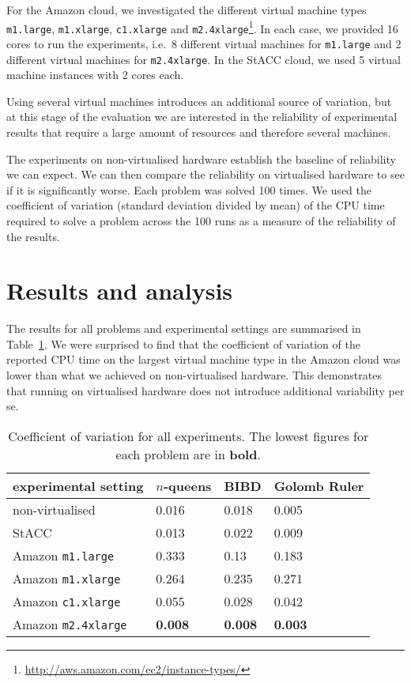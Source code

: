 \documentclass{llncs}
\begin{document}
For the Amazon cloud, we investigated the different virtual machine types
\texttt{m1.large}, \texttt{m1.xlarge}, \texttt{c1.xlarge} and
\texttt{m2.4xlarge}\footnote{\url{http://aws.amazon.com/ec2/instance-types/}}.
In each case, we provided 16 cores to run the experiments, i.e.\ 8 different
virtual machines for \texttt{m1.large} and 2 different virtual machines for
\texttt{m2.4xlarge}. In the StACC cloud, we used 5 virtual machine instances
with 2 cores each.

Using several virtual machines introduces an additional source of variation, but
at this stage of the evaluation we are interested in the reliability of
experimental results that require a large amount of resources and therefore
several machines.

The experiments on non-virtualised hardware establish the baseline of
reliability we can expect. We can then compare the reliability on virtualised
hardware to see if it is significantly worse. Each problem was solved 100 times.
We used the coefficient of variation (standard deviation divided by mean) of the
CPU time required to solve a problem across the 100 runs as a measure of the
reliability of the results.


\section{Results and analysis}

The results for all problems and experimental settings are summarised in
Table~\ref{res}. We were surprised to find that the coefficient of variation of
the reported CPU time on the largest virtual machine type in the Amazon cloud
was lower than what we achieved on non-virtualised hardware. This demonstrates
that running on virtualised hardware does not introduce additional variability
per se.

\begin{table}
\centering
\begin{tabular}{llll}
experimental setting & $n$-queens & BIBD & Golomb Ruler\\\midrule
non-virtualised & 0.016 & 0.018 & 0.005\\
StACC & 0.013 & 0.022 & 0.009\\
Amazon \texttt{m1.large} & 0.333 & 0.13 & 0.183\\
Amazon \texttt{m1.xlarge} & 0.264 & 0.235 & 0.271\\
Amazon \texttt{c1.xlarge} & 0.055 & 0.028 & 0.042\\
Amazon \texttt{m2.4xlarge} & \textbf{0.008} & \textbf{0.008} & \textbf{0.003}\\
\end{tabular}
\caption{Coefficient of variation for all experiments. The lowest figures for
each problem are in \textbf{bold}.}
\label{res}
\end{table}
\end{document}
